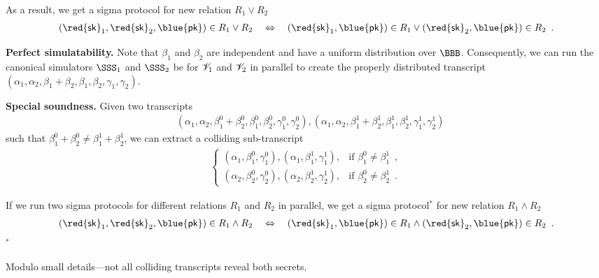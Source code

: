 \documentclass[landscape,footrule]{foils}
\renewcommand{\SK}{{\red{\mathsf{sk}}}}
\renewcommand{\PK}{{\blue{\mathsf{pk}}}}
\begin{document}
\addtocounter{page}{-1} 
%

As a result, we get a sigma protocol for new relation $R_1\vee R_2$
\begin{align*}
  (\SK_1,\SK_2,\PK)\in R_1\vee R_2
 \quad\Leftrightarrow\quad 
 (\SK_1,\PK)\in R_1\vee (\SK_2,\PK)\in R_2\enspace.
\end{align*}


\textbf{Perfect simulatability.}  Note that $\beta_1$ and $\beta_2$
are independent and have a uniform distribution over
$\BBB$. Consequently, we can run the canonical simulators $\SSS_1$ and
$\SSS_2$ be for $\mathscr{V}_1$ and $\mathscr{V}_2$ in parallel to create
the properly distributed transcript
$(\alpha_1,\alpha_2,\beta_1+\beta_2,\beta_1,\beta_2,\gamma_1,\gamma_2)$.
\Bigskip


\textbf{Special soundness.}
Given two transcripts
\begin{align*}
  &(\alpha_1,\alpha_2,\beta_1^0+\beta_2^0,\beta_1^0,\beta_2^0,\gamma_1^0,\gamma_2^0),
  (\alpha_1,\alpha_2,\beta_1^1+\beta_2^1,\beta_1^1,\beta_2^1,\gamma_1^1,\gamma_2^1)
\end{align*}
such that $ \beta_1^0+\beta_2^0\neq\beta_1^1+\beta_2^1$, we can extract a colliding sub-transcript
\begin{align*}
  \begin{cases}
  (\alpha_1,\beta_1^0,\gamma_1^0),(\alpha_1,\beta_1^1,\gamma_1^1),&\text{if } \beta_1^0\neq\beta_1^1\enspace,\\
  (\alpha_2,\beta_2^0,\gamma_2^0),(\alpha_2,\beta_2^1,\gamma_2^1),&\text{if } \beta_2^0\neq\beta_2^1\enspace.
  \end{cases}
\end{align*}

\enlargethispage{1cm}

If we run two sigma protocols  for different relations $R_1$ and $R_2$
in parallel, we get a sigma protocol$^*$ for new relation $R_1\wedge
R_2$
\begin{align*}
  (\SK_1,\SK_2,\PK)\in R_1\wedge R_2
  \quad\Leftrightarrow\quad
  (\SK_1,\PK)\in R_1\wedge (\SK_2,\PK)\in R_2\enspace.
\end{align*}
$^*$
\begin{small}
  Modulo small details---not all colliding
  transcripts reveal both secrets.
\end{small}
\end{document}
